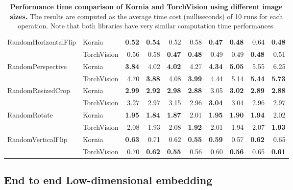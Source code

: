 \begin{table}[!ht]
\begin{tabular}{llrrrrrrrr}
\midrule
RandomHorizontalFlip & Kornia &   \bfseries0.52 &   \bfseries0.54 &   0.52 &   0.58 &   \bfseries0.47 &   \bfseries0.48 &   0.64 &   \bfseries0.48 \\
                   & TorchVision &   0.56 &   0.58 &   \bfseries0.47 &   \bfseries0.48 &   0.49 &   0.49 &   \bfseries0.48 &   0.51 \\
\midrule
RandomPerspective & Kornia &   \bfseries3.84 &   4.02 &   \bfseries4.02 &   4.27 &   \bfseries4.34 &   \bfseries5.05 &   5.55 &   6.25 \\
                   & TorchVision &   4.70 &   \bfseries3.88 &   4.08 &   \bfseries3.99 &   4.44 &   5.14 &   \bfseries5.44 &   \bfseries5.73 \\
\midrule
RandomResizedCrop & Kornia &   \bfseries2.99 &   \bfseries2.92 &   \bfseries2.98 &   \bfseries2.88 &   3.05 &   \bfseries3.02 &   \bfseries2.89 &   \bfseries2.88 \\
                   & TorchVision &   3.27 &   2.97 &   3.15 &   2.96 &   \bfseries3.04 &   3.04 &   2.96 &   2.97 \\
\midrule
RandomRotate & Kornia &   \bfseries1.95 &   \bfseries1.84 &   \bfseries1.87 &   2.01 &   \bfseries1.95 &   \bfseries1.90 &   \bfseries1.94 &   2.02 \\
                   & TorchVision &   2.08 &   1.93 &   2.08 &   \bfseries1.92 &   2.01 &   1.94 &   2.07 &   \bfseries1.93 \\
\midrule
RandomVerticalFlip & Kornia &   \bfseries0.63 &   0.71 &   0.62 &  \bfseries 0.55 &   \bfseries0.59 &   0.57 &   \bfseries0.62 &   0.65 \\
                   & TorchVision &   0.70 &   \bfseries0.62 &   \bfseries0.55 &   0.56 &   0.60 &   \bfseries0.56 &   0.65 &   \bfseries0.61 \\
\bottomrule
\end{tabular}
\vspace{.5cm}
\caption{\label{tab: op_kornia_vs_torchvision} {\bf Performance time comparison of Kornia and TorchVision using different image sizes.} The results are computed as the average time cost (milliseconds) of 10 runs for each operation. Note that  both libraries have very similar computation time performances. 
}
\end{table}

\subsection{End to end Low-dimensional embedding}
\label{section:use_cases:image_reconstruction}

